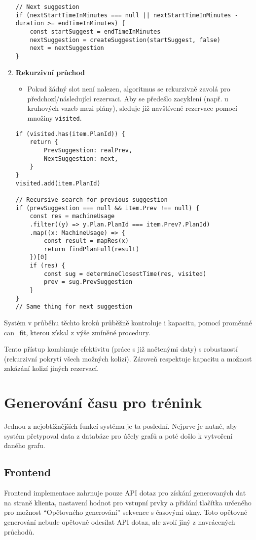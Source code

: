 \begin{enumerate}
\begin{lstlisting}
// Next suggestion
if (nextStartTimeInMinutes === null || nextStartTimeInMinutes - duration >= endTimeInMinutes) {
    const startSuggest = endTimeInMinutes
    nextSuggestion = createSuggestion(startSuggest, false)
    next = nextSuggestion
}
    \end{lstlisting}

    \item \textbf{Rekurzivní průchod}
    \begin{itemize}
         
    \item Pokud žádný slot není nalezen, algoritmus se rekurzivně zavolá pro předchozí/následující rezervaci. Aby se předešlo zacyklení (např. u kruhových vazeb mezi plány), sleduje již navštívené rezervace pomocí množiny \texttt{visited}. 

    \end{itemize}
    \begin{lstlisting}
if (visited.has(item.PlanId)) {
    return {
	    PrevSuggestion: realPrev,
	    NextSuggestion: next,
    }
}
visited.add(item.PlanId)

// Recursive search for previous suggestion
if (prevSuggestion === null && item.Prev !== null) {
    const res = machineUsage
	.filter((y) => y.Plan.PlanId === item.Prev?.PlanId)
	.map((x: MachineUsage) => {
	    const result = mapRes(x)
	    return findPlanFull(result)
	})[0]
    if (res) {
	    const sug = determineClosestTime(res, visited)
	    prev = sug.PrevSuggestion
    }
}
// Same thing for next suggestion
    \end{lstlisting}
    
\end{enumerate}
Systém v průběhu těchto kroků průběžně kontroluje i kapacitu, pomocí proměnné can\_fit, kterou získal z výše zmíněné procedury. 

Tento přístup kombinuje efektivitu (práce s již načtenými daty) s robustností (rekurzivní pokrytí všech možných kolizí). Zároveň respektuje kapacitu a možnost zakázání kolizí jiných rezervací.

\section{Generování času pro trénink}
Jednou z nejobtížnějších funkcí systému je ta poslední. Nejprve je nutné, aby systém přetypoval data z databáze pro účely grafů a poté došlo k vytvoření daného grafu.

\subsection{Frontend}
Frontend implementace zahrnuje pouze API dotaz pro získání generovaných dat na straně klienta, nastavení hodnot pro vstupní prvky a přidání tlačítka určeného pro možnost ``Opětovného generování'' sekvence s časovými okny. Toto opětovné generování nebude opětovně odesílat API dotaz, ale zvolí jiný z navrácených průchodů.

